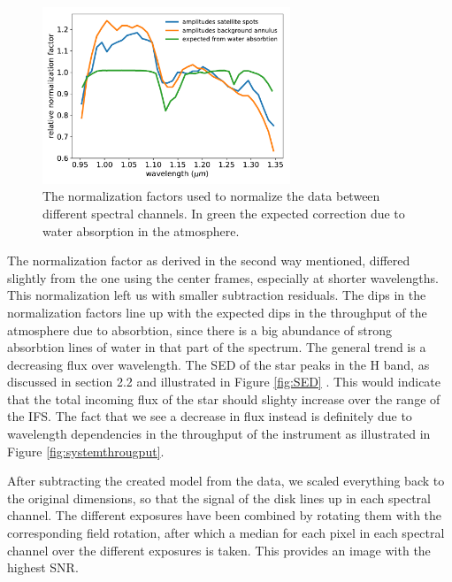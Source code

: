 \documentclass[twoside,single,12pt]{lion-msc}
\begin{document}
\begin{figure}
\centering
\vspace{-12mm}
\includegraphics[width = 0.66\textwidth]{allnormalization}
\caption{The normalization factors used to normalize the data between different spectral channels. In green the expected correction due to water absorption in the atmosphere.}
\label{fig:throughputnorm}
\vspace{-2mm}
\end{figure}
The normalization factor as derived in the second way mentioned, differed slightly from the one using the center frames, especially at shorter wavelengths. This normalization left us with smaller subtraction residuals. The dips in the normalization factors line up with the expected dips in the throughput of the atmosphere due to absorbtion, since there is a big abundance of strong absorbtion lines of water in that part of the spectrum. The general trend is a decreasing flux over wavelength. The SED of the star peaks in the H band, as discussed in section 2.2 and illustrated in Figure \ref{fig:SED} \citep{Padgett2008}. This would indicate that the total incoming flux of the star should slighty increase over the range of the IFS. The fact that we see a decrease in flux instead is definitely due to wavelength dependencies in the throughput of the instrument as illustrated in Figure \ref{fig:systemthrougput}.
\bigskip

After subtracting the created model from the data, we scaled everything back to the original dimensions, so that the signal of the disk lines up in each spectral channel. The different exposures have been combined by rotating them with the corresponding field rotation, after which a median for each pixel in each spectral channel over the different exposures is taken. This provides an image with the highest SNR.
\end{document}
